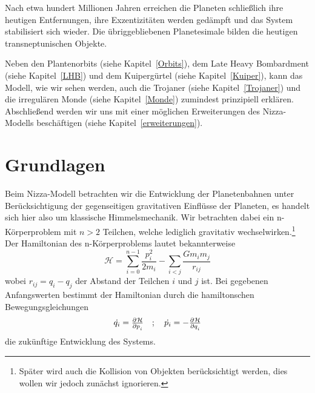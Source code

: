 \documentclass[12pt,a4paper,twoside]{article}
\newcommand{\refsec}[1]{siehe Kapitel~\ref{#1}}
\begin{document}
Nach etwa hundert Millionen Jahren erreichen die Planeten schließlich ihre heutigen Entfernungen, ihre Exzentizitäten werden gedämpft und das System stabilisiert sich wieder. Die übriggebliebenen Planetesimale bilden die heutigen transneptunischen Objekte.

Neben den Plantenorbits (\refsec{Orbits}), dem Late Heavy Bombardment (\refsec{LHB}) und dem Kuipergürtel (\refsec{Kuiper}), kann das Modell, wie wir sehen werden, auch die Trojaner (\refsec{Trojaner}) und die irregulären Monde (\refsec{Monde}) zumindest prinzipiell erklären.
Abschließend werden wir uns mit einer möglichen Erweiterungen des Nizza-Modells beschäftigen (\refsec{erweiterungen}).

\FloatBarrier
\section{Grundlagen}
Beim Nizza-Modell betrachten wir die Entwicklung der Planetenbahnen unter Be\-rück\-sich\-ti\-gung der gegenseitigen gravitativen Einflüsse der Planeten, es handelt sich hier also um klassische Himmelsmechanik. %
Wir betrachten dabei ein n-Körperproblem mit $n>2$ Teilchen, welche lediglich gravitativ wechselwirken.\footnote{Später wird auch die Kollision von Objekten berücksichtigt werden, dies wollen wir jedoch zunächst ignorieren.}
Der Hamiltonian des n-Körperproblems lautet bekannterweise
\begin{equation}\label{eq:nbodyhamilton}
{\mathcal H} = \sum\limits_{i=0}^{n-1} \frac{p_i^2}{2m_i} - \sum\limits_{i<j} \frac{Gm_im_j}{r_{ij}}
\end{equation}
wobei $r_{ij}=q_i-q_j$ der Abstand der Teilchen $i$ und $j$ ist. %
Bei gegebenen Anfangswerten bestimmt der Hamiltonian durch die hamiltonschen Bewegungsgleichungen
\begin{equation}
\dot{q_i} = \pd{\mathcal H}{p_i} \quad ; \quad \dot{p_i} = - \pd{\mathcal H}{q_i}
\end{equation}
die zukünftige Entwicklung des Systems.
\end{document}
